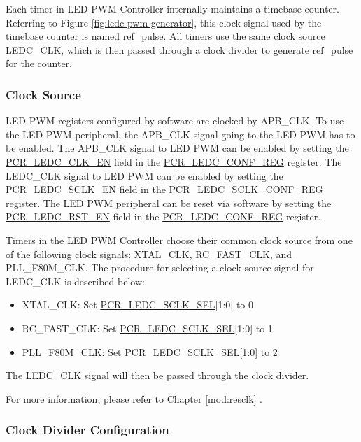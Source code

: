 \documentclass[main\_\_EN.tex]{subfiles}
\begin{document}
Each timer in LED PWM Controller internally maintains a timebase counter. Referring to Figure \ref{fig:ledc-pwm-generator}, this clock signal used by the timebase counter is named ref\_pulse. All timers use the same clock source LEDC\_CLK, which is then passed through a clock divider to generate ref\_pulse for the counter.

\subsubsection{Clock Source}

LED PWM registers configured by software are clocked by APB\_CLK. To use the LED PWM peripheral, the APB\_CLK signal going to the LED PWM has to be enabled. The APB\_CLK signal to LED PWM can be enabled by setting the \hyperref[fielddesc:PCRLEDCCLKEN]{PCR\_LEDC\_CLK\_EN} field in the \hyperref[regdesc:PCRLEDCCONFREG]{PCR\_LEDC\_CONF\_REG} register. The LEDC\_CLK signal to LED PWM can be enabled by setting the \hyperref[fielddesc:PCRLEDCSCLKEN]{PCR\_LEDC\_SCLK\_EN} field in the \hyperref[regdesc:PCRLEDCSCLKCONFREG]{PCR\_LEDC\_SCLK\_CONF\_REG} register. The LED PWM peripheral can be reset via software by setting the \hyperref[fielddesc:PCRLEDCRSTEN]{PCR\_LEDC\_RST\_EN} field in the \hyperref[regdesc:PCRLEDCCONFREG]{PCR\_LEDC\_CONF\_REG} register.

Timers in the LED PWM Controller choose their common clock source from one of the following clock signals: XTAL\_CLK, RC\_FAST\_CLK, and PLL\_F80M\_CLK. The procedure for selecting a clock source signal for LEDC\_CLK is described below:

\begin{itemize}
    \item XTAL\_CLK: Set \hyperref[fielddesc:PCRLEDCSCLKSEL]{PCR\_LEDC\_SCLK\_SEL}[1:0] to 0
    \item RC\_FAST\_CLK: Set \hyperref[fielddesc:PCRLEDCSCLKSEL]{PCR\_LEDC\_SCLK\_SEL}[1:0] to 1
    \item PLL\_F80M\_CLK: Set \hyperref[fielddesc:PCRLEDCSCLKSEL]{PCR\_LEDC\_SCLK\_SEL}[1:0] to 2
\end{itemize}

The LEDC\_CLK signal will then be passed through the clock divider.

For more information, please refer to Chapter \ref{mod:resclk} \textit{}.

\subsubsection{Clock Divider Configuration}
\end{document}
